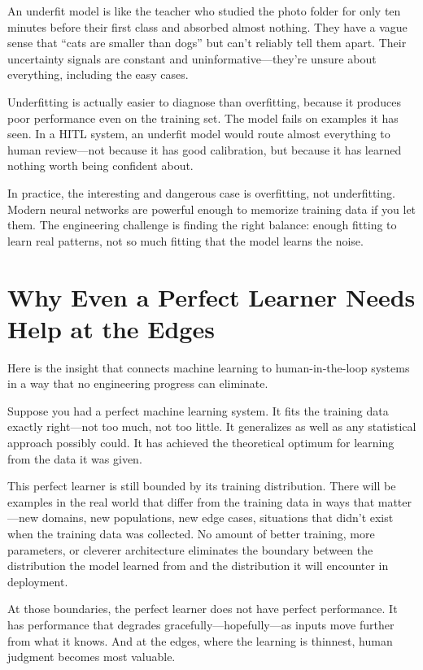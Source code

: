 An underfit model is like the teacher who studied the photo folder for only ten minutes before their first class and absorbed almost nothing. They have a vague sense that ``cats are smaller than dogs'' but can't reliably tell them apart. Their uncertainty signals are constant and uninformative---they're unsure about everything, including the easy cases.

Underfitting is actually easier to diagnose than overfitting, because it produces poor performance even on the training set. The model fails on examples it has seen. In a HITL system, an underfit model would route almost everything to human review---not because it has good calibration, but because it has learned nothing worth being confident about.

In practice, the interesting and dangerous case is overfitting, not underfitting. Modern neural networks are powerful enough to memorize training data if you let them. The engineering challenge is finding the right balance: enough fitting to learn real patterns, not so much fitting that the model learns the noise.

\section{Why Even a Perfect Learner Needs Help at the Edges}

Here is the insight that connects machine learning to human-in-the-loop systems in a way that no engineering progress can eliminate.

Suppose you had a perfect machine learning system. It fits the training data exactly right---not too much, not too little. It generalizes as well as any statistical approach possibly could. It has achieved the theoretical optimum for learning from the data it was given.

This perfect learner is still bounded by its training distribution. There will be examples in the real world that differ from the training data in ways that matter---new domains, new populations, new edge cases, situations that didn't exist when the training data was collected. No amount of better training, more parameters, or cleverer architecture eliminates the boundary between the distribution the model learned from and the distribution it will encounter in deployment.

At those boundaries, the perfect learner does not have perfect performance. It has performance that degrades gracefully---hopefully---as inputs move further from what it knows. And at the edges, where the learning is thinnest, human judgment becomes most valuable.

